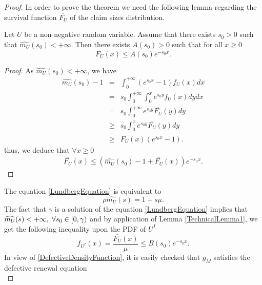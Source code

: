 \begin{proof}
In order to prove the theorem we need the following lemma regarding the survival function $\overline{F_{U}}$ of the claim sizes distribution.
\begin{Lemm}\label{TechnicalLemma1}
Let $U$ be a non-negative random variable. Assume that there exists $s_{0}>0$ such that $\widehat{
m_{U}}(s_{0})<+\infty$. Then there exists $A(s_{0})>0$ such that for all $x\geq 0$
\begin{equation}
\overline{F_{U}}(x)\leq A(s_{0})e^{-s_{0}x}.
\end{equation} 
\end{Lemm}
\begin{proof}
As $\widehat{m_{U}}(s_{0})<+\infty$, we have
\begin{eqnarray*}
\widehat{m_{U}}(s_{0})-1&=&\int_{0}^{+\infty}(e^{s_{0}x}-1)f_{U}(x)dx\\
&=&s_{0}\int_{0}^{+\infty}\int^{x}_{0}e^{s_{0}y}f_{U}(x)dydx\\
&=&s_{0}\int_{0}^{+\infty}e^{s_{0}y}\overline{F_{U}}(y)dy\\
&\geq&s_{0}\int_{0}^{x}e^{s_{0}y}\overline{F_{U}}(y)dy\\
&\geq&\overline{F_{U}}(x)(e^{s_{0}x}-1).
\end{eqnarray*}
thus, we deduce that $\forall x\geq0$
\begin{eqnarray}
\overline{F_{U}}(x)\leq(\widehat{m_{U}}(s_{0})-1+\overline{F_{U}}(x))e^{-s_{0}x}.
\end{eqnarray}
\end{proof}
The equation \eqref{LundbergEquation} is equivalent to 
\begin{equation}\label{LundbergEquationRemastered}
\rho\widehat{m_{U}}(s)=1+s\mu.
\end{equation}
The fact that $\gamma$ is a solution of the equation \eqref{LundbergEquation} implies that $\widehat{m_{U}}(s)<+\infty,\hspace{0,1cm} \forall s_{0}\in[0,\gamma)$ and by application of Lemma \ref{TechnicalLemma1}, we get the following inequality upon the PDF of $U^{I}$
\begin{equation}
f_{U^{I}}(x)=\frac{\overline{F_{U}}(x)}{\mu}\leq B(s_{0})e^{-s_{0}x}.
\end{equation}
In view of \eqref{DefectiveDensityFunction}, it is easily checked that $g_{M}$ satisfies the defective renewal equation
\begin{equation}\label{RenewalEquation}

\end{equation}
\end{proof}
